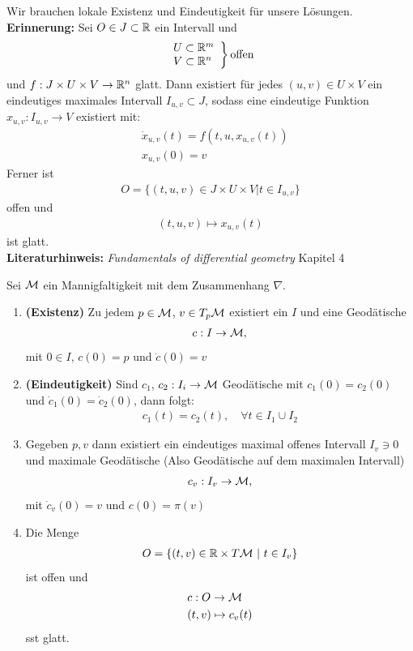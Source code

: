 Wir brauchen lokale Existenz und Eindeutigkeit für unsere Lösungen.\\
\textbf{Erinnerung:} Sei $O \in J \subset \mathbb{R}$ ein Intervall und
\begin{align*}
\left. \begin{array}{l}
U \subset \mathbb{R}^m\\
V \subset \mathbb{R}^n
\end{array}
\right\} 
\mathrm{offen}
\end{align*}
und $f: J \times U \times V \to \mathbb{R}^n$ glatt.
Dann existiert für jedes $(u, v) \in U \times V$ ein eindeutiges maximales Intervall $I_{u, v} \subset J$, sodass eine eindeutige Funktion
$x_{u,v}: I_{u, v} \to V$ existiert mit:
\begin{align*}
&\dot{x}_{u, v} (t) = f(t, u, x_{u,v}(t))\\
&x_{u, v}(0) = v
\end{align*}
Ferner ist 
\begin{align*}
O = \{ (t, u, v) \in J \times U \times V  \vert t \in I_{u, v}\}
\end{align*}
offen und
\begin{align*}
(t, u, v) \mapsto x_{u,v}(t)
\end{align*}
ist glatt.\\
\textbf{Literaturhinweis:} \textit{Fundamentals of differential geometry} Kapitel 4
\begin{satz}
Sei $\mathcal{M}$ ein Mannigfaltigkeit mit dem Zusammenhang $\nabla$.
\begin{enumerate}
\item \textbf{(Existenz)} Zu jedem $p \in \mathcal{M}$, $v \in T_p \mathcal{M}$ existiert ein $I$ und eine Geodätische
\begin{align*}
c: I \to \mathcal{M} ,
\end{align*}
mit $0\in I$, $c(0) = p$ und $\dot{c}(0)=v$
\item \textbf{(Eindeutigkeit)} Sind $c_1$, $c_2 : I_i \to \mathcal{M}$ Geodätische mit $c_1(0) = c_2(0)$ und $\dot{c}_1 (0) = \dot{c}_2 (0)$, dann folgt:
\begin{align*}
c_1(t) = c_2(t), \quad \forall t \in I_1 \cup I_2
\end{align*}
\item Gegeben $p, v$ dann existiert ein eindeutiges maximal offenes Intervall $I_v \ni 0$ und maximale Geodätische (Also Geodätische auf dem maximalen Intervall)
\begin{align*}
c_v : I_v \to \mathcal{M} ,
\end{align*}
mit $\dot{c}_v (0) = v$ und $c(0)= \pi (v)$
\item Die Menge
\begin{align*}
O = \{ (t, v) \in \mathbb{R} \times T \mathcal{M} \ \vert \ t \in I_v \}
\end{align*}
ist offen und 
\begin{align*}
&c: O \to \mathcal{M}\\
& (t,v) \mapsto c_v(t)
\end{align*}
sst glatt.
\end{enumerate}
\end{satz}
